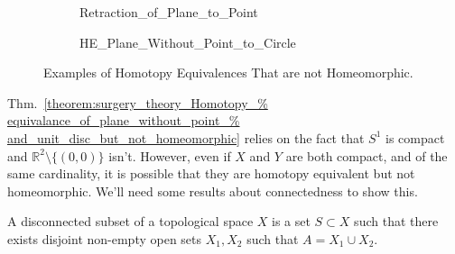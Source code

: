 \documentclass[crop=false,class=book,oneside]{standalone}
\begin{document}
            \begin{figure}[H]
                \centering
                \captionsetup{type=figure}
                \begin{subfigure}[b]{0.33\textwidth}
                    \captionsetup{type=figure}
                    \centering
                    {Retraction_of_Plane_to_Point}
                    \label{fig:surgery_theory_course_homotopy_%
                           equivalence_diagram_of_plane_with_point}
                \end{subfigure}
                \begin{subfigure}[b]{0.66\textwidth}
                    \captionsetup{type=figure}
                    \centering
                    
                              {HE_Plane_Without_Point_to_Circle}
                    \label{fig:surgery_theory_homotopy_equivalence_%
                           between_the_plane_with_a_point_removed_%
                           and_the_unit_circle}
                \end{subfigure}
                \caption{Examples of Homotopy Equivalences
                         That are not Homeomorphic.}
                \label{%
                    fig:surgery_theory_course_various_HE_%
                    but_not_homeo_examples%
                }
            \end{figure}
            Thm.~\ref{theorem:surgery_theory_Homotopy_%
                      equivalance_of_plane_without_point_%
                      and_unit_disc_but_not_homeomorphic}
            relies on the fact that $S^{1}$ is compact and
            $\mathbb{R}^{2}\setminus\{(0,0)\}$ isn't.
            However, even if $X$ and $Y$ are both
            compact, and of the same cardinality, it is possible
            that they are homotopy equivalent but not homeomorphic.
            We'll need some results about connectedness to show this.
            \begin{definition}
                A disconnected subset of a topological space $X$
                is a set $S\subset{X}$ such that there exists
                disjoint non-empty open sets $X_{1},X_{2}$ such
                that $A=X_{1}\cup{X_{2}}$.
            \end{definition}
\end{document}
